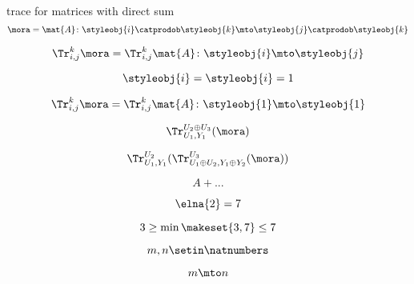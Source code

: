 {\begin{forslides}
    trace for matrices with direct sum
    \begin{equation}
        \label{eq:feedback-006}
        \mora = \mat{A} \colon \styleobj{i} \catprodob \styleobj{k} \mto \styleobj{j} \catprodob \styleobj{k}
    \end{equation}

    \begin{equation}
        \label{eq:feedback-007}
        \Tr_{i,j}^{k} \mora = \Tr_{i,j}^{k} \mat{A} \colon \styleobj{i} \mto \styleobj{j}
    \end{equation}

    \begin{equation}
        \label{eq:feedback-008}
        \styleobj{i} = \styleobj{i} = 1
    \end{equation}

    \begin{equation}
        \label{eq:feedback-009}
        \Tr_{i,j}^{k} \mora = \Tr_{i,j}^{k} \mat{A} \colon \styleobj{1} \mto \styleobj{1}
    \end{equation}

    \begin{equation}
        \label{eq:feedback-010}
        \Tr_{U_1, Y_1}^{U_2 \oplus U_3}(\mora)
    \end{equation}

    \begin{equation}
        \label{eq:feedback-011}
        \Tr_{U_1, Y_1}^{U_2} ( \Tr_{U_1 \oplus U_2, Y_1 \oplus Y_2}^{U_3}(\mora))
    \end{equation}

    \begin{equation}
        \label{eq:feedback-012}
        A + 
        ...
    \end{equation}

    \begin{equation}
        \label{eq:feedback-013}
        \elna{2} = 7
    \end{equation}

    \begin{equation}
        \label{eq:feedback-014}
        3 \geq \min \makeset{3, 7} \leq 7
    \end{equation}

    \begin{equation}
        \label{eq:feedback-015}
        m, n \setin \natnumbers
    \end{equation}

    \begin{equation}
        \label{eq:feedback-016}
        m \mto n
    \end{equation}


\end{forslides}}
